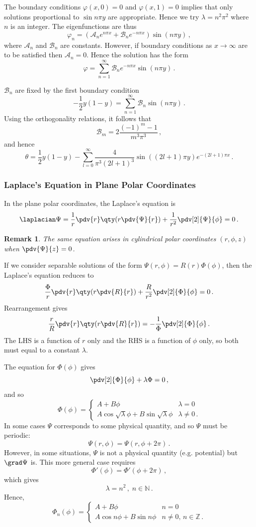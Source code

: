 \documentclass{article}
\theoremstyle{plain}\theoremheaderfont{\normalfont\itshape}\theorembodyfont{\rmfamily}\theoremseparator{.}\newtheorem*{rem}{Remark}\newtheorem*{ex}{Example}\newtheorem*{proof}{Proof}\newtheorem*{altp}{Alternative proof}
\theoremstyle{plain}\theoremheaderfont{\normalfont\bfseries}\theorembodyfont{\rmfamily}\theoremseparator{.}\newtheorem{thm}{Theorem}[section]\newtheorem{lem}[thm]{Lemma}\newtheorem{prop}[thm]{Proposition}\newtheorem*{cor}{Corollary}\newtheorem{defn}[thm]{Definition}\newtheorem{clm}[thm]{Claim}\newtheorem{clminproof}{Claim}
\theoremstyle{break}\theoremheaderfont{\normalfont\itshape}\theorembodyfont{\rmfamily}\theoremseparator{.\medskip}\newtheorem*{proofskip}{Proof}\newtheorem*{exs}{Examples}\newtheorem*{rems}{Remarks}
\theoremstyle{break}\theoremheaderfont{\normalfont\bfseries}\theorembodyfont{\rmfamily}\theoremseparator{.\medskip}\newtheorem{lemskip}[thm]{Lemma}\newtheorem{defnskip}[thm]{Definition}\newtheorem{propskip}[thm]{Proposition}\newtheorem{thmskip}[thm]{Theorem}
\numberwithin{equation}{section}
\begin{document}
	The boundary conditions \(\varphi(x,0)=0\) and \(\varphi(x,1)=0\) implies that only solutions proportional to \(\sin n\pi y\) are appropriate. Hence we try \(\lambda=n^2\pi^2\) where \(n\) is an integer. The eigenfunctions are thus
	\[\varphi_n=(\mathcal{A}_n e^{n\pi x}+\mathcal{B}_n e^{-n\pi x})\sin(n\pi y)\,,\]
	where \(\mathcal{A}_n\) and \(\mathcal{B}_n\) are constants. However, if boundary conditions as \(x\to \infty\) are to be satisfied then \(\mathcal{A}_n=0\). Hence the solution has the form
	\[\varphi=\sum_{n=1}^{\infty}\mathcal{B}_n e^{-n\pi x}\sin(n\pi y)\,.\]
	
	\(\mathcal{B}_n\) are fixed by the first boundary condition
	\[-\frac{1}{2}y(1-y)=\sum_{n=1}^{\infty}\mathcal{B}_n\sin(n\pi y)\,.\]
	Using the orthogonality relations, it follows that
	\[\mathcal{B}_m=2\frac{(-1)^m-1}{m^3\pi^3}\,,\]
	and hence
	\[\theta=\frac{1}{2}y(1-y)-\sum_{l=0}^{\infty}\frac{4}{\pi^3(2l+1)^3}\sin((2l+1)\pi y)e^{-(2l+1)\pi x}\,.\]
	\subsubsection{Laplace's Equation in Plane Polar Coordinates}
	In the plane polar coordinates, the Laplace's equation is
	\[\laplacian\Psi=\frac{1}{r}\pdv{r}\qty(r\pdv{\Psi}{r})+\frac{1}{r^2}\pdv[2]{\Psi}{\phi}=0\,.\]
	\begin{rem}
		The same equation arises in cylindrical polar coordinates \((r,\phi,z)\) when \(\pdv{\Psi}{z}=0\).
	\end{rem}

	If we consider separable solutions of the form \(\Psi(r,\phi)=R(r)\Phi(\phi)\), then the Laplace's equation reduces to
	\[\frac{\Phi}{r}\pdv{r}\qty(r\pdv{R}{r})+\frac{R}{r^2}\pdv[2]{\Phi}{\phi}=0\,.\]
	Rearrangement gives
	\[\frac{r}{R}\pdv{r}\qty(r\pdv{R}{r})=-\frac{1}{\Phi}\pdv[2]{\Phi}{\phi}\,.\]
	The LHS is a function of \(r\) only and the RHS is a function of \(\phi\) only, so both must equal to a constant \(\lambda\).

	The equation for \(\Phi(\phi)\) gives
	\[\pdv[2]{\Phi}{\phi}+\lambda\Phi=0\,,\]
	and so
	\[\Phi(\phi)=\begin{cases}
		A+B\phi & \lambda=0\\
		A\cos\sqrt{\lambda}\phi+B\sin\sqrt{\lambda}\phi & \lambda\ne 0\,.
	\end{cases}\]
	In some cases \(\Psi\) corresponds to some physical quantity, and so \(\Psi\) must be periodic:
	\[\Psi(r,\phi)=\Psi(r,\phi+2\pi)\,.\]
	However, in some situations, \(\Psi\) is not a physical quantity (e.g. potential) but \(\grad\Psi\) is. This more general case requires
	\[\Phi'(\phi)=\Phi'(\phi+2\pi)\,,\]
	which gives
	\[\lambda=n^2\,,\;n\in\mathbb{N}\,.\]
	Hence,
	\[\Phi_n(\phi)=\begin{cases}
		A+B\phi & n=0\\
		A\cos n\phi+B\sin n\phi & n\ne 0,\, n\in\mathbb{Z}\,.
	\end{cases}\]
\end{document}
